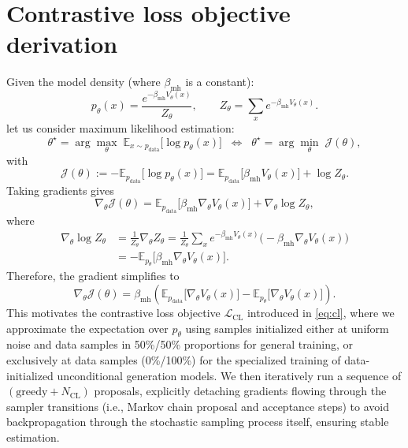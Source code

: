 \section{Contrastive loss objective derivation}\label{app:energy-refinement}
Given the model density (where $\beta_{\mathrm{mh}}$ is a constant):
\begin{equation}
p_\theta(x)=\frac{e^{-\beta_{\mathrm{mh}} V_\theta(x)}}{Z_\theta},
\qquad
Z_\theta=\sum_x e^{-\beta_{\mathrm{mh}} V_\theta(x)}.
\end{equation}
let us consider maximum likelihood estimation:
\begin{equation}
\theta^\star=\arg\max_\theta\;\mathbb{E}_{x\sim p_{\text{data}}}\big[\log p_\theta(x)\big]
\;\;\Longleftrightarrow\;\;
\theta^\star=\arg\min_\theta\;\mathcal{J}(\theta),
\end{equation}
with
\begin{equation}
\mathcal{J}(\theta):=-\mathbb{E}_{p_{\text{data}}}\big[\log p_\theta(x)\big]
=\mathbb{E}_{p_{\text{data}}}\big[\beta_{\mathrm{mh}} V_\theta(x)\big]+\log Z_\theta.
\end{equation}
Taking gradients gives
\begin{equation}
\nabla_\theta \mathcal{J}(\theta)
=\mathbb{E}_{p_{\text{data}}}\big[\beta_{\mathrm{mh}}\nabla_\theta V_\theta(x)\big]
+\nabla_\theta \log Z_\theta,
\end{equation}
where
\begin{equation}
\begin{aligned}
\nabla_\theta \log Z_\theta
&=\frac{1}{Z_\theta}\nabla_\theta Z_\theta
=\frac{1}{Z_\theta}\sum_x e^{-\beta_{\mathrm{mh}} V_\theta(x)}\big(-\beta_{\mathrm{mh}}\nabla_\theta V_\theta(x)\big)\\
&=-\mathbb{E}_{p_\theta}\big[\beta_{\mathrm{mh}}\nabla_\theta V_\theta(x)\big].
\end{aligned}
\end{equation}
Therefore, the gradient simplifies to
\begin{equation}
\boxed{
\nabla_\theta \mathcal{J}(\theta)
=\beta_{\mathrm{mh}}\left(\mathbb{E}_{p_{\text{data}}}\big[\nabla_\theta V_\theta(x)\big]
-\mathbb{E}_{p_\theta}\big[\nabla_\theta V_\theta(x)\big]\right)
}.
\end{equation}
This motivates the contrastive loss objective \(\mathcal{L}_{\mathrm{CL}}\) introduced in \eqref{eq:cl}, where we approximate the expectation over \(p_\theta\) using samples initialized either at uniform noise and data samples in 50\%/50\% proportions for general training, or exclusively at data samples (0\%/100\%) for the specialized training of data-initialized unconditional generation models. We then iteratively run a sequence of \((\text{greedy} + N_{\mathrm{CL}})\) proposals, explicitly detaching gradients flowing through the sampler transitions (i.e., Markov chain proposal and acceptance steps) to avoid backpropagation through the stochastic sampling process itself, ensuring stable estimation.
